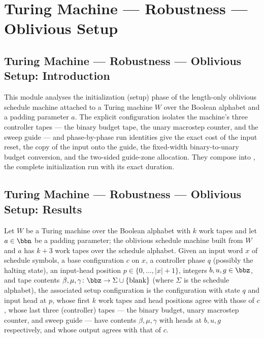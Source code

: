 \section{Turing Machine --- Robustness --- Oblivious Setup}
\subsection*{Turing Machine --- Robustness --- Oblivious Setup: Introduction}

This module analyses the initialization (setup) phase of the length-only oblivious
schedule machine attached to a Turing machine $W$ over the Boolean alphabet and a
padding parameter $a$.  The explicit configuration  isolates
the machine's three controller tapes --- the binary budget tape, the unary macrostep
counter, and the sweep guide --- and phase-by-phase run identities give the exact cost
of the input reset, the copy of the input onto the guide, the fixed-width
binary-to-unary budget conversion, and the two-sided guide-zone allocation.  They
compose into , the complete initialization run
with its exact duration.

\subsection*{Turing Machine --- Robustness --- Oblivious Setup: Results}

\begin{definition}
\label{Complexity.setupCfg}
\leanok
{}
Let $W$ be a Turing machine over the Boolean alphabet with $k$ work tapes and let
$a \in \bbn$ be a padding parameter; the oblivious schedule machine built from $W$ and
$a$ has $k+3$ work tapes over the schedule alphabet.  Given an input word $x$ of
schedule symbols, a base configuration $c$ on $x$, a controller phase $q$ (possibly the
halting state), an input-head position $p \in \{0,\dots,|x|+1\}$, integers
$b, u, g \in \bbz$, and tape contents $\beta, \mu, \gamma \colon \bbz \to
\Sigma \cup \{\text{blank}\}$ (where $\Sigma$ is the schedule alphabet), the associated
setup configuration is the configuration with state $q$ and input head at $p$, whose
first $k$ work tapes and head positions agree with those of $c$, whose last three
(controller) tapes --- the binary budget, unary macrostep counter, and sweep guide ---
have contents $\beta, \mu, \gamma$ with heads at $b, u, g$ respectively, and whose
output agrees with that of $c$.
\end{definition}

